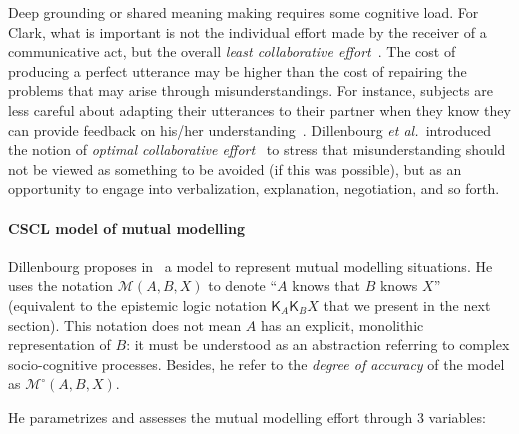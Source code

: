 \documentclass{sig-alternate}
\newcommand{\etal}{{\textit{et al.~}}}
\newcommand{\model}[3]{{$\mathcal{M}(#1, #2, #3)$}}
\newcommand{\Model}[3]{{$\mathcal{M}^{\circ}(#1, #2, #3)$}}
\begin{document}
Deep grounding or shared meaning making requires some cognitive load. For Clark,
what is important is not the individual effort made by the receiver of a
communicative act, but the overall \emph{least collaborative
effort}~\cite{clark1986referring}.  The cost of producing a perfect utterance
may be higher than the cost of repairing the problems that may arise through
misunderstandings. For instance, subjects are less careful about adapting their
utterances to their partner when they know they can provide feedback on his/her
understanding~\cite{schober1993spatial}. Dillenbourg \etal introduced the
notion of \emph{optimal collaborative effort}~\cite{dillenbourg1995evolution} to
stress that misunderstanding should not be viewed as something to be avoided (if
this was possible), but as an opportunity to engage into verbalization,
explanation, negotiation, and so forth.

\paragraph{CSCL model of mutual modelling}
\label{cscl-model}

Dillenbourg proposes in~\cite{sangin2007partner} a model to represent mutual
modelling situations. He uses the notation \model{A}{B}{X} to denote ``$A$ knows
that $B$ knows $X$'' (equivalent to the epistemic logic notation
$\mathsf{K}_{A}\mathsf{K}_{B}X$ that we present in the next section). This
notation does not mean $A$ has an explicit, monolithic representation of $B$: it
must be understood as an abstraction referring to complex socio-cognitive
processes. Besides, he refer to the \emph{degree of accuracy} of the model as
\Model{A}{B}{X}.

He parametrizes and assesses the mutual modelling effort through 3 variables:
\end{document}
